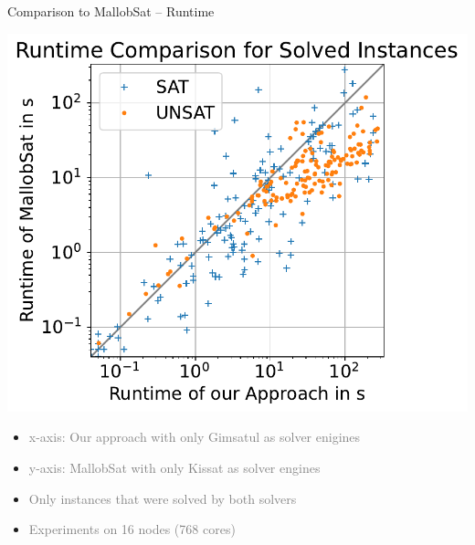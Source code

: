 \documentclass[]{sdqbeamer}
\begin{document}
\begin{frame}{Comparison to MallobSat -- Runtime}
    \begin{minipage}{.45\textwidth}
        \center
        \includegraphics[scale=.8]{plots/square_runtime_compare/square_runtime_16node.pdf}\\
    \end{minipage}
    \hfill
    \begin{minipage}{.45\textwidth}
        \begin{itemize}
            \item \textcolor{gray}{x-axis: Our approach with only Gimsatul as solver enigines}
            \item \textcolor{gray}{y-axis: MallobSat with only Kissat as solver engines}
            \item \textcolor{gray}{Only instances that were solved by both solvers}
            \item \textcolor{gray}{Experiments on 16 nodes (768 cores)}
        \end{itemize}
    \end{minipage}
\end{frame}
\end{document}
